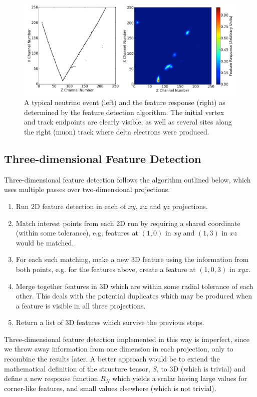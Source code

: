 \begin{figure}
    \includegraphics[width=\textwidth]{chapters/latte_images/feature-response}
    \caption[Feature response for a typical neutrino event]{\label{fig:feature-response}A typical neutrino event (left) and the feature response (right) as determined by the feature detection algorithm. The initial vertex and track endpoints are clearly visible, as well as several sites along the right (muon) track where delta electrons were produced.}
\end{figure}

\subsection{Three-dimensional Feature Detection}
Three-dimensional feature detection follows the algorithm outlined below, which uses multiple passes over two-dimensional projections.
\begin{enumerate}
    \item Run 2D feature detection in each of $xy$, $xz$ and $yz$ projections.
    \item Match interest points from each 2D run by requiring a shared coordinate (within some tolerance), e.g. features at $(1,0)$ in $xy$ and $(1,3)$ in $xz$ would be matched.
    \item For each such matching, make a new 3D feature using the information from both points, e.g. for the features above, create a feature at $(1,0,3)$ in $xyz$.
    \item Merge together features in 3D which are within some radial tolerance of each other. This deals with the potential duplicates which may be produced when a feature is visible in all three projections.
    \item Return a list of 3D features which survive the previous steps.
\end{enumerate}

Three-dimensional feature detection implemented in this way is imperfect, since we throw away information from one dimension in each projection, only to recombine the results later. A better approach would be to extend the mathematical definition of the structure tensor, $S$, to 3D (which is trivial) and define a new response function $R_N$ which yields a scalar having large values for corner-like features, and small values elsewhere (which is not trivial).

